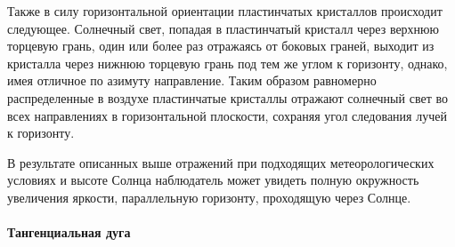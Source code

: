 Также в силу горизонтальной ориентации пластинчатых кристаллов происходит следующее. Солнечный свет, попадая в пластинчатый кристалл через верхнюю торцевую грань, один или более раз отражаясь от боковых граней, выходит из кристалла через нижнюю торцевую грань под тем же углом к горизонту, однако, имея отличное по азимуту направление. Таким образом равномерно распределенные в воздухе пластинчатые кристаллы отражают солнечный свет во всех направлениях в горизонтальной плоскости, сохраняя угол следования лучей к горизонту.

В результате описанных выше отражений при подходящих метеорологических условиях и высоте Солнца наблюдатель может увидеть полную окружность увеличения яркости, параллельную горизонту, проходящую через Солнце.


\paragraph{Тангенциальная дуга}


